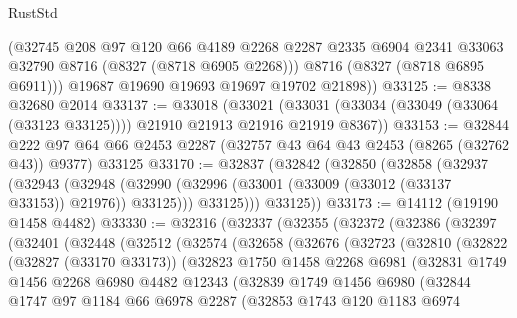 \begin{lexlean}{RustStd}
\begin{coremodule}
{\begin{coremodule}
{{{{{{{{{{{{{{{{{{{{{{{{{{{{{{{{{{{{{{{{{{{{{{{{{{{{{{          (@32745
            @208
            @97
            @120
            @66
            @4189
            @2268
            @2287
            @2335
            @6904
            @2341
            @33063
            @32790
            @8716
            (@8327 (@8718 @6905 @2268)))
          @8716
          (@8327 (@8718 @6895 @6911)))
        @19687
        @19690
        @19693
        @19697
        @19702
        @21898))
@33125 := @8338 @32680 @2014
@33137 := @33018
    (@33021 (@33031 (@33034 (@33049 (@33064 (@33123 @33125)))) @21910 @21913 @21916 @21919 @8367))
@33153 := @32844
    @222
    @97
    @64
    @66
    @2453
    @2287
    (@32757 @43 @64 @43 @2453 (@8265 (@32762 @43)) @9377)
    @33125
@33170 := @32837
    (@32842
      (@32850
        (@32858
          (@32937
            (@32943
              (@32948 (@32990 (@32996 (@33001 (@33009 (@33012 (@33137 @33153)) @21976)) @33125)))
              @33125)))
        @33125))
@33173 := @14112 (@19190 @1458 @4482)
@33330 := @32316
    (@32337
      (@32355
        (@32372
          (@32386
            (@32397
              (@32401
                (@32448
                  (@32512
                    (@32574
                      (@32658
                        (@32676
                          (@32723
                            (@32810
                              (@32822
                                (@32827 (@33170 @33173))
                                (@32823
                                  @1750
                                  @1458
                                  @2268
                                  @6981
                                  (@32831
                                    @1749
                                    @1456
                                    @2268
                                    @6980
                                    @4482
                                    @12343
                                    (@32839
                                      @1749
                                      @1456
                                      @6980
                                      (@32844
                                        @1747
                                        @97
                                        @1184
                                        @66
                                        @6978
                                        @2287
                                        (@32853
                                          @1743
                                          @120
                                          @1183
                                          @6974
}}}}}}}}}}}}}}}}}}}}}}}}}}}}}}}}}}}}}}}}}}}}}}}}}}}}}}
\end{coremodule}}
\end{coremodule}
\end{lexlean}
